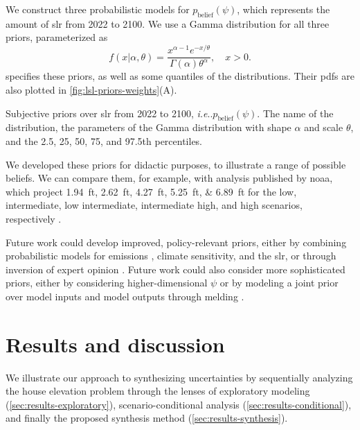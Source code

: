 \documentclass[11pt]{article}
\makeatletter
\DeclareRobustCommand\onedot{\futurelet\@let@token\@onedot}
\def\@onedot{\ifx\@let@token.\else.\null\fi\xspace}
\def\ie{\emph{i.e}\onedot} \def\Ie{\emph{I.e}\onedot}
\DeclareRobustCommand\onedot{\futurelet\@let@token\@onedot}
\def\@onedot{\ifx\@let@token.\else.\null\fi\xspace}
\def\ie{\emph{i.e}\onedot} \def\Ie{\emph{I.e}\onedot}
\makeatother
\begin{document}
We construct three probabilistic models for $p_\text{belief}(\psi)$, which represents the amount of \gls{slr} from 2022 to 2100.
We use a Gamma distribution for all three priors, parameterized as
\begin{equation*}
    f(x | \alpha, \theta) = \frac{x^{\alpha-1} e^{-x/\theta}}{\Gamma(\alpha) \theta^\alpha},
    \quad x > 0.
\end{equation*}
 specifies these priors, as well as some quantiles of the distributions.
Their \glspl{pdf} are also plotted in \cref{fig:lsl-priors-weights}(A).

\begin{table}[h]
    \centering
    \caption{
        Subjective priors over \gls{slr} from 2022 to 2100, \ie $p_\text{belief}(\psi)$.
        The name of the distribution, the parameters of the Gamma distribution with shape $\alpha$ and scale $\theta$, and the 2.5, 25, 50, 75, and 97.5th percentiles.
    }\label{tab:slr-priors}
    
\end{table}

We developed these priors for didactic purposes, to illustrate a range of possible beliefs.
We can compare them, for example, with analysis published by \gls{noaa}, which project \SIlist{1.94;2.62;4.27;5.25;6.89}{ft} for the low, intermediate, low intermediate, intermediate high, and high scenarios, respectively \citep[table.~2.4]{sweet_slr:2022}.

Future work could develop improved, policy-relevant priors, either by combining probabilistic models for emissions \citep[as in][]{srikrishnan_probabilistic:2022}, climate sensitivity, and the \gls{slr}, or through inversion of expert opinion \citep[as in][]{fuller_inversion:2017}.
Future work could also consider more sophisticated priors, either by considering higher-dimensional $\psi$ or by modeling a joint prior over model inputs and model outputs through melding \citep{poole_melding:2000,sevcikova_melding:2007}.

\section{Results and discussion}\label{sec:results}

We illustrate our approach to synthesizing uncertainties by sequentially analyzing the house elevation problem through the lenses of exploratory modeling (\cref{sec:results-exploratory}), scenario-conditional analysis (\cref{sec:results-conditional}), and finally the proposed synthesis method (\cref{sec:results-synthesis}).
\end{document}
